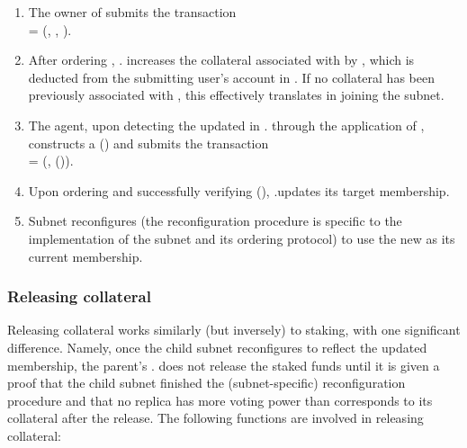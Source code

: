 \begin{enumerate}

    \item The owner of  submits the transaction\\
     = (, , ).

    \item After ordering , . increases the collateral associated with  by ,
    which is deducted from the submitting user's account in .
    If no collateral has been previously associated with , this effectively translates in  joining the subnet.

    \item \label{item:update-membership} The \ipc agent, upon detecting the updated  in . through the application of ,
    constructs a {\pof}() and submits the transaction\\
     = (, {\pof}()).

    \item Upon ordering  and successfully verifying {\pof}(), .\gw updates its target membership.

    \item Subnet  reconfigures (the reconfiguration procedure is specific to the implementation of the subnet and its ordering protocol)
    to use the new  as its current membership.
    
\end{enumerate}

\subsubsection{Releasing collateral}

Releasing collateral works similarly (but inversely) to staking, with one significant difference.
Namely, once the child subnet  reconfigures to reflect the updated membership, the parent's \saFull {}. does not release the staked funds
until it is given a proof that the child subnet  finished the (subnet-specific) reconfiguration procedure
and that no replica has more voting power than corresponds to its collateral after the release.
The following functions are involved in releasing collateral:


